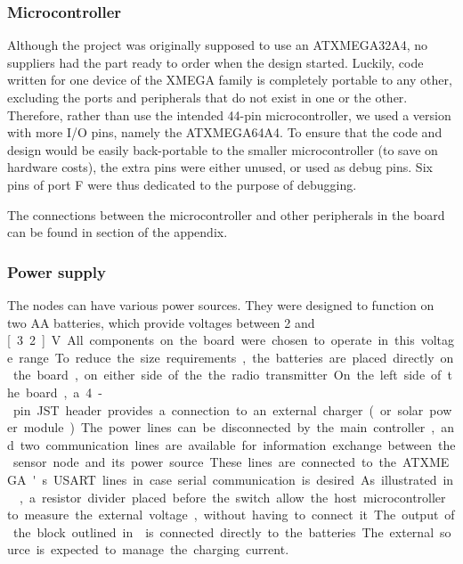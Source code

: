 \subsubsection{Microcontroller}

Although the project was originally supposed to use an ATXMEGA32A4, no suppliers
had the part ready to order when the design started. Luckily, code written for
one device of the XMEGA family is completely portable to any other, excluding
the ports and peripherals that do not exist in one or the other. Therefore,
rather than use the intended 44-pin microcontroller, we used a version with more
I/O pins, namely the ATXMEGA64A4. To ensure that the code and design would be
easily back-portable to the smaller microcontroller (to save on hardware costs),
the extra pins were either unused, or used as debug pins. Six pins of port F
were thus dedicated to the purpose of debugging. 

The connections between the microcontroller and other peripherals in the board
can be found in section  of the appendix.

\subsubsection{Power supply}
\label{sub2:hardware-powersupply}

The nodes can have various power sources. They were designed to function on two
AA batteries, which provide voltages between 2 and \unit[3.2]{V}. All components
on the board were chosen to operate in this voltage range.

To reduce the size requirements, the batteries are placed directly on the board,
on either side of the the radio transmitter. 

On the left side of the board, a 4-pin JST header provides a connection to an
external charger (or solar power module). The power lines can be disconnected by
the main controller, and two communication lines are available for information
exchange between the sensor node and its power source. These lines are connected
to the ATXMEGA's USART lines in case serial communication is desired.

As illustrated in , a resistor divider placed before the
switch allow the host microcontroller to measure the external voltage, without
having to connect it. The output of the block outlined in
 is connected directly to the batteries. The external
source is expected to manage the charging current.

